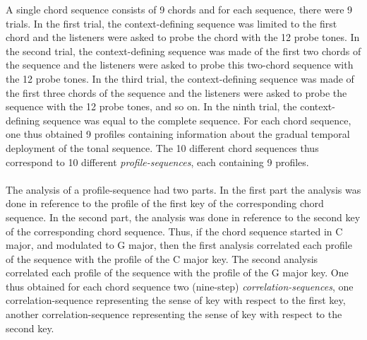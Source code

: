 A single chord sequence consists of 9 chords and for each
sequence, there were 9 trials. In the first trial, the
context-defining sequence was limited to the first chord and the
listeners were asked to probe the chord with the 12 probe tones.
In the second trial, the context-defining sequence was made of the
first two chords of the sequence and the listeners were asked to
probe this two-chord sequence with the 12 probe tones. In the
third trial, the context-defining sequence was made of the first
three chords of the sequence and the listeners were asked to probe
the sequence with the 12 probe tones, and so on. In the ninth
trial, the context-defining sequence was equal to the complete
sequence. For each chord sequence, one thus obtained 9 profiles
containing information about the gradual temporal deployment of
the tonal sequence. The 10 different chord sequences thus
correspond to 10 different {\sl profile-sequences}, each
containing 9 profiles.\\\\

The analysis of a profile-sequence had two parts. In the first
part the analysis was done in reference to the profile of the
first key of the corresponding chord sequence. In the second part,
the analysis was done in reference to the second key of the
corresponding chord sequence. Thus, if the chord sequence started
in C major, and modulated to G major, then the first analysis
correlated each profile of the sequence with the profile of the C
major key. The second analysis correlated each profile of the
sequence with the profile of the G major key. One thus obtained
for each chord sequence two (nine-step) {\sl
correlation-sequences}, one correlation-sequence representing the
sense of key with respect to the first key, another
correlation-sequence representing the sense of key with respect to
the second key.\\\\

